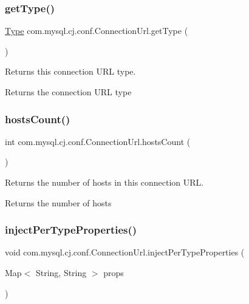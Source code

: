 \subsubsection{\texorpdfstring{get\+Type()}{getType()}}
{\footnotesize\ttfamily \mbox{\hyperlink{enumcom_1_1mysql_1_1cj_1_1conf_1_1_connection_url_1_1_type}{Type}} com.\+mysql.\+cj.\+conf.\+Connection\+Url.\+get\+Type (\begin{DoxyParamCaption}{ }\end{DoxyParamCaption})}

Returns this connection U\+RL type.

\begin{DoxyReturn}{Returns}
the connection U\+RL type 
\end{DoxyReturn}
\mbox{\label{classcom_1_1mysql_1_1cj_1_1conf_1_1_connection_url_ac75c964d5381fcfeaebed87ee2bb22b3}} 
\subsubsection{\texorpdfstring{hosts\+Count()}{hostsCount()}}
{\footnotesize\ttfamily int com.\+mysql.\+cj.\+conf.\+Connection\+Url.\+hosts\+Count (\begin{DoxyParamCaption}{ }\end{DoxyParamCaption})}

Returns the number of hosts in this connection U\+RL.

\begin{DoxyReturn}{Returns}
the number of hosts 
\end{DoxyReturn}
\mbox{\label{classcom_1_1mysql_1_1cj_1_1conf_1_1_connection_url_a7898c43cc847ca9819dfc98d96089563}} 
\subsubsection{\texorpdfstring{inject\+Per\+Type\+Properties()}{injectPerTypeProperties()}}
{\footnotesize\ttfamily void com.\+mysql.\+cj.\+conf.\+Connection\+Url.\+inject\+Per\+Type\+Properties (\begin{DoxyParamCaption}\item[{Map$<$ String, String $>$}]{props }\end{DoxyParamCaption})\hspace{0.3cm}{\ttfamily [protected]}}

